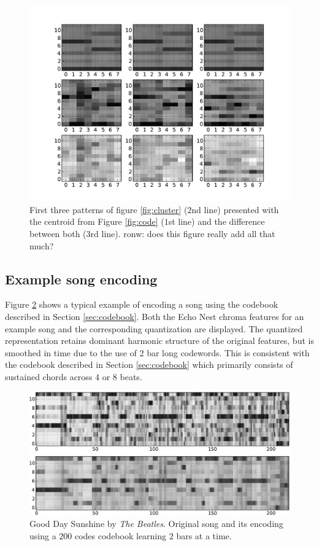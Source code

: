 \documentclass{article}
\begin{document}
\begin{figure}[htb]
\begin{center}
\includegraphics[width=.8\columnwidth]{close_patterns_diff}
\end{center}
\caption{\small{First three patterns of figure \ref{fig:cluster}
($2$nd line) presented with the centroid from Figure \ref{fig:code}
($1$st line) and the difference between both ($3$rd line).
}
ronw: does this figure really add all that much?
}
\label{fig:cluster_diff}
\end{figure}

\subsection{Example song encoding}

Figure \ref{fig:encodesong} shows a typical example of encoding a song
using the codebook described in Section \ref{sec:codebook}.  Both the
Echo Nest chroma features for an example song and the corresponding
quantization are displayed.  The quantized representation retains
dominant harmonic structure of the original features, but is smoothed
in time due to the use of 2 bar long codewords.
%
This is consistent with the codebook described in Section
\ref{sec:codebook} which primarily consists of sustained chords across
4 or 8 beats.

\begin{figure}[htb]
\begin{center}
\includegraphics[width=.9\columnwidth]{song_encoded}
\end{center}
\caption{\small{Good Day Sunshine by \textit{The Beatles}.
Original song and its encoding using a $200$ codes codebook learning
$2$ bars at a time.
}}
\label{fig:encodesong}
\end{figure}
\end{document}
